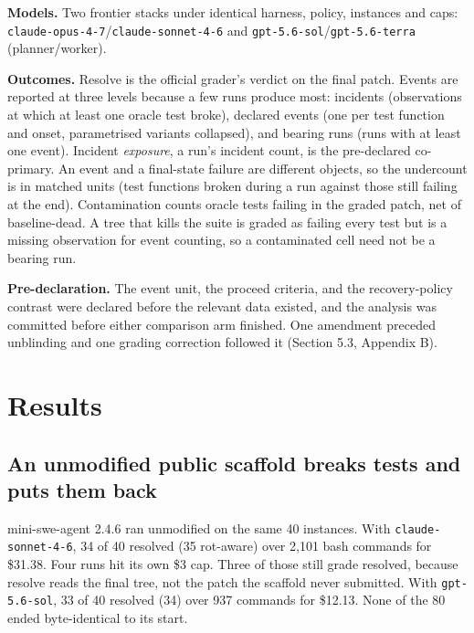 \documentclass{article}
\begin{document}
\textbf{Models.} Two frontier stacks under identical harness, policy, instances and caps: \texttt{claude-opus-4-7}/\texttt{claude-sonnet-4-6} and \texttt{gpt-5.6-sol}/\texttt{gpt-5.6-terra} (planner/worker).

\textbf{Outcomes.} Resolve is the official grader's verdict on the final patch. Events are reported at three levels because a few runs produce most: incidents (observations at which at least one oracle test broke), declared events (one per test function and onset, parametrised variants collapsed), and bearing runs (runs with at least one event). Incident \emph{exposure}, a run's incident count, is the pre-declared co-primary. An event and a final-state failure are different objects, so the undercount is in matched units (test functions broken during a run against those still failing at the end). Contamination counts oracle tests failing in the graded patch, net of baseline-dead. A tree that kills the suite is graded as failing every test but is a missing observation for event counting, so a contaminated cell need not be a bearing run.

\textbf{Pre-declaration.} The event unit, the proceed criteria, and the recovery-policy contrast were declared before the relevant data existed, and the analysis was committed before either comparison arm finished. One amendment preceded unblinding and one grading correction followed it (Section 5.3, Appendix B).

\section{Results}

\subsection{An unmodified public scaffold breaks tests and puts them back}

mini-swe-agent 2.4.6 ran unmodified on the same 40 instances. With \texttt{claude-sonnet-4-6}, 34 of 40 resolved (35 rot-aware) over 2,101 bash commands for \$31.38. Four runs hit its own \$3 cap. Three of those still grade resolved, because resolve reads the final tree, not the patch the scaffold never submitted. With \texttt{gpt-5.6-sol}, 33 of 40 resolved (34) over 937 commands for \$12.13. None of the 80 ended byte-identical to its start.
\end{document}
